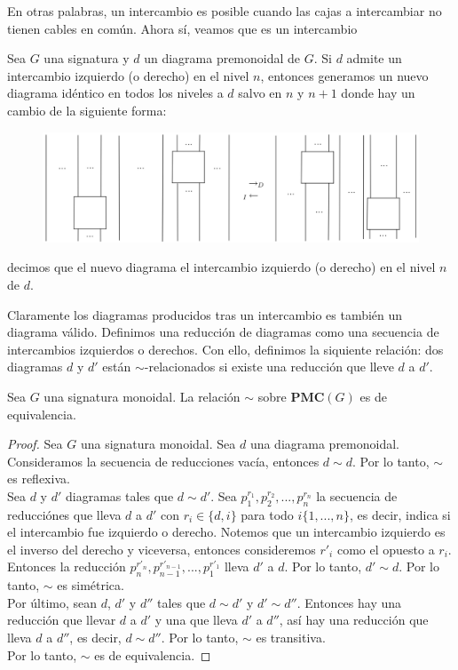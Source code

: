 \documentclass[../main.tex]{subfiles}
\begin{document}
En otras palabras, un intercambio es posible cuando las cajas a intercambiar no tienen cables en común. Ahora sí, veamos que es un intercambio

\begin{dfn}
	Sea $G$ una signatura y $d$ un diagrama premonoidal de $G$. Si $d$ admite un intercambio izquierdo (o derecho) en el nivel $n$, entonces generamos un nuevo diagrama idéntico en todos los niveles a $d$ salvo en $n$ y $n+1$ donde hay un cambio de la siguiente forma: 
	
	\begin{figure}[H]
		\includegraphics[scale=5]{diagrama/izqder.png}
		\centering
	\end{figure}
	
	decimos que el nuevo diagrama el intercambio izquierdo (o derecho) en el nivel $n$ de $d$.
\end{dfn}

Claramente los diagramas producidos tras un intercambio es también un diagrama válido. Definimos una reducción de diagramas como una secuencia de intercambios izquierdos o derechos. Con ello, definimos la siquiente relación: dos diagramas $d$ y $d'$ están $\sim$-relacionados si existe una reducción que lleve $d$ a $d'$. 

\begin{prop}
	Sea $G$ una signatura monoidal. La relación $\sim$ sobre $\textbf{PMC}(G)$ es de equivalencia. 
	\label{equiv}
\end{prop}
\begin{proof}
	Sea $G$ una signatura monoidal.
	Sea $d$ una diagrama premonoidal. Consideramos la secuencia de reducciones vacía, entonces $d \sim d$. Por lo tanto, $\sim$ es reflexiva.\\
	Sea $d$ y $d'$ diagramas tales que $d \sim d'$. Sea $p_1^{r_1}, p_2^{r_2}, ... , p_n^{r_n}$ la secuencia de reducciónes que lleva $d$ a $d'$ con $r_i \in \{ d, i\}$ para todo $i \{1, ...,n \}$, es decir, indica si el intercambio fue izquierdo o derecho. Notemos que un intercambio izquierdo es el inverso del derecho y viceversa, entonces consideremos $r'_{i}$ como el opuesto a $r_{i}$. Entonces la reducción $p_n^{r'_n}, p_{n-1}^{r'_{n-1}}, ... , p_1^{r'_1}$ lleva $d'$ a $d$. Por lo tanto, $d' \sim d$. Por lo tanto, $\sim$ es simétrica. \\  
	Por último, sean $d$, $d'$ y $d''$ tales que $d \sim d'$ y $d' \sim d''$. Entonces hay una reducción que llevar $d$ a $d'$ y una que lleva $d'$ a $d''$, así hay una reducción que lleva $d$ a $d''$, es decir, $d \sim d''$. Por lo tanto, $\sim$ es transitiva. \\
	Por lo tanto, $\sim$ es de equivalencia. 
\end{proof}
\end{document}
